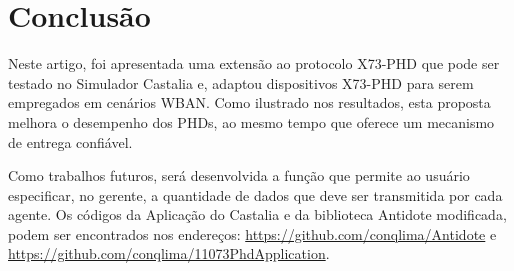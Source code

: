 \section{Conclusão}\label{conclusion}
Neste artigo, foi apresentada uma extensão ao protocolo X73-PHD que pode ser testado no Simulador Castalia e, adaptou dispositivos X73-PHD para serem empregados em cenários WBAN.
Como ilustrado nos resultados, esta proposta melhora o desempenho dos PHDs, ao mesmo tempo que oferece um mecanismo de entrega confiável. 

Como trabalhos futuros, será desenvolvida a função que permite ao usuário especificar, no gerente, a quantidade de dados que deve ser transmitida por cada agente. Os códigos da Aplicação do Castalia e da biblioteca Antidote modificada, podem ser encontrados nos endereços: \url{https://github.com/conqlima/Antidote} e \url{https://github.com/conqlima/11073PhdApplication}. 

